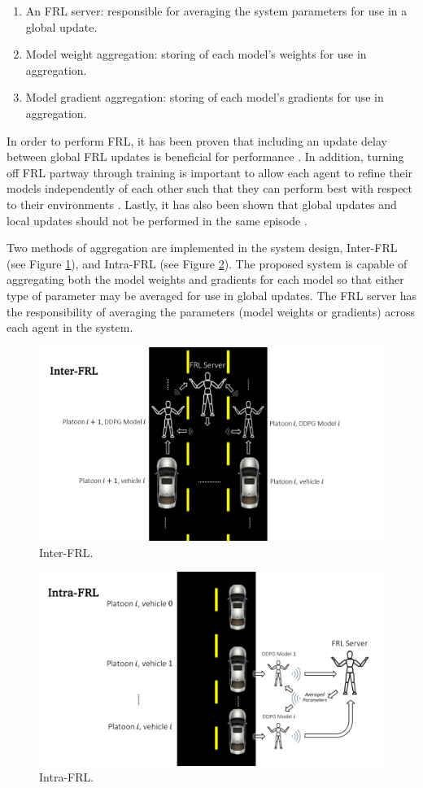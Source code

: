 \begin{enumerate}
    \item An FRL server: responsible for averaging the system parameters for use in a
    global update.
    \item Model weight aggregation: storing of each model's weights for use in
    aggregation.
    \item Model gradient aggregation: storing of each model's gradients for use in
     aggregation.
\end{enumerate}

In order to perform FRL, it has been proven that including an update delay between global
FRL updates is beneficial for performance \cite{Lim2020}. In addition, turning off FRL
partway through training is important to allow each agent to refine their models
independently of each other such that they can perform best with respect to their
environments \cite{Lim2020}.  Lastly, it has also been shown that global updates and
local updates should not be performed in the same episode \cite{Liang2019}.

Two methods of aggregation are implemented in the system design, Inter-FRL
(see Figure \ref{fig:interfrl}), and Intra-FRL (see Figure \ref{fig:intrafrl}).
The proposed system is capable of aggregating both the model weights and gradients
for each model so that either type of parameter may be averaged for use in global updates.
The FRL server has the responsibility of averaging the parameters
(model weights or gradients) across each agent in the system.

\begin{figure}[H]
    \centering
    \includegraphics[width=0.69\linewidth]{assets/interfrl.PNG}
    \caption{Inter-FRL.}
    \label{fig:interfrl}
\end{figure}
\begin{figure}[H]
    \centering
    \includegraphics[width=0.69\linewidth]{assets/intrafrl.PNG}
    \caption{Intra-FRL.}
    \label{fig:intrafrl}
\end{figure}


